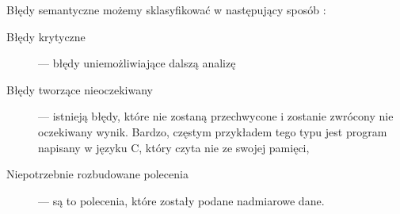  Błędy semantyczne możemy sklasyfikować w następujący sposób \cite{link_semantic}:
\begin{description}
 \item[Błędy krytyczne] ---
    błędy uniemożliwiające dalszą analizę 
 \item[Błędy tworzące nieoczekiwany] --- 
    istnieją błędy, które nie zostaną przechwycone i zostanie zwrócony nie oczekiwany wynik. Bardzo,
    częstym przykładem tego typu jest program napisany w języku C, który czyta nie ze swojej pamięci,
 \item[Niepotrzebnie rozbudowane polecenia] --- są to polecenia, które zostały podane nadmiarowe dane.
\end{description}


\begin{comment} 
\end{comment}